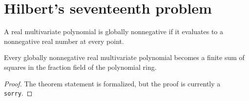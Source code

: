 \section{Hilbert's seventeenth problem}

\begin{definition}
\label{def:hilbert17-nonnegative}
\leanok
A real multivariate polynomial is globally nonnegative if it evaluates to a nonnegative real number at every point.
\end{definition}

\begin{theorem}
\label{thm:hilbert17}
\notready
{}
Every globally nonnegative real multivariate polynomial becomes a finite sum of squares in the fraction field of the polynomial ring.
\end{theorem}

\begin{proof}
The theorem statement is formalized, but the proof is currently a \texttt{sorry}.
\end{proof}
